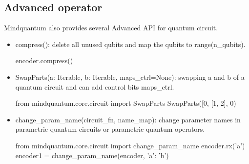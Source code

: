 \subsection{Advanced operator}
Mindquantum also provides several Advanced API for quantum circuit.
\begin{itemize}
    \item compress(): delete all unused qubits and map the qubits to range(n\_qubits).
    \begin{python}
encoder.compress()        
    \end{python}
    \item SwapParts(a: Iterable, b: Iterable, maps\_ctrl=None): swapping a and b of a quantum circuit and can add control bits maps\_ctrl.
    \begin{python}
from mindquantum.core.circuit import SwapParts
SwapParts([0, [1, 2], 0)        
    \end{python}
    \item change\_param\_name(circuit\_fn, name\_map): change parameter names in parametric quantum circuits or parametric quantum operators.
    \begin{python}
from mindquantum.core.circuit import change_param_name
encoder.rx('a')
encoder1 = change_param_name(encoder, {'a': 'b'})        
    \end{python}
\end{itemize}
